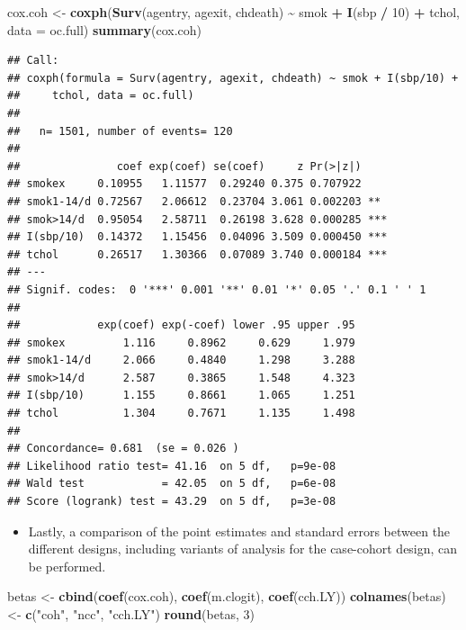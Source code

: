 \documentclass[
]{book}
\newenvironment{Shaded}{\begin{snugshade}}{\end{snugshade}}
\newcommand{\AttributeTok}[1]{\textcolor[rgb]{0.13,0.29,0.53}{#1}}
\newcommand{\DecValTok}[1]{\textcolor[rgb]{0.00,0.00,0.81}{#1}}
\newcommand{\FunctionTok}[1]{\textcolor[rgb]{0.13,0.29,0.53}{\textbf{#1}}}
\newcommand{\NormalTok}[1]{#1}
\newcommand{\OtherTok}[1]{\textcolor[rgb]{0.56,0.35,0.01}{#1}}
\newcommand{\SpecialCharTok}[1]{\textcolor[rgb]{0.81,0.36,0.00}{\textbf{#1}}}
\newcommand{\StringTok}[1]{\textcolor[rgb]{0.31,0.60,0.02}{#1}}
\providecommand{\tightlist}{%
  \setlength{\itemsep}{0pt}\setlength{\parskip}{0pt}}
\theoremstyle{definition}
\theoremstyle{definition}
\theoremstyle{definition}
\theoremstyle{definition}
\theoremstyle{remark}
\begin{document}
\begin{Shaded}
\begin{Highlighting}[]
\NormalTok{cox.coh }\OtherTok{\textless{}{-}} \FunctionTok{coxph}\NormalTok{(}\FunctionTok{Surv}\NormalTok{(agentry, agexit, chdeath) }\SpecialCharTok{\textasciitilde{}}
\NormalTok{  smok }\SpecialCharTok{+} \FunctionTok{I}\NormalTok{(sbp }\SpecialCharTok{/} \DecValTok{10}\NormalTok{) }\SpecialCharTok{+}\NormalTok{ tchol, }\AttributeTok{data =}\NormalTok{ oc.full)}
\FunctionTok{summary}\NormalTok{(cox.coh)}
\end{Highlighting}
\end{Shaded}

\begin{verbatim}
## Call:
## coxph(formula = Surv(agentry, agexit, chdeath) ~ smok + I(sbp/10) + 
##     tchol, data = oc.full)
## 
##   n= 1501, number of events= 120 
## 
##               coef exp(coef) se(coef)     z Pr(>|z|)    
## smokex     0.10955   1.11577  0.29240 0.375 0.707922    
## smok1-14/d 0.72567   2.06612  0.23704 3.061 0.002203 ** 
## smok>14/d  0.95054   2.58711  0.26198 3.628 0.000285 ***
## I(sbp/10)  0.14372   1.15456  0.04096 3.509 0.000450 ***
## tchol      0.26517   1.30366  0.07089 3.740 0.000184 ***
## ---
## Signif. codes:  0 '***' 0.001 '**' 0.01 '*' 0.05 '.' 0.1 ' ' 1
## 
##            exp(coef) exp(-coef) lower .95 upper .95
## smokex         1.116     0.8962     0.629     1.979
## smok1-14/d     2.066     0.4840     1.298     3.288
## smok>14/d      2.587     0.3865     1.548     4.323
## I(sbp/10)      1.155     0.8661     1.065     1.251
## tchol          1.304     0.7671     1.135     1.498
## 
## Concordance= 0.681  (se = 0.026 )
## Likelihood ratio test= 41.16  on 5 df,   p=9e-08
## Wald test            = 42.05  on 5 df,   p=6e-08
## Score (logrank) test = 43.29  on 5 df,   p=3e-08
\end{verbatim}

\begin{itemize}
\tightlist
\item
  Lastly, a comparison of the point estimates and standard errors between
  the different designs, including variants of analysis for the case-cohort design, can be performed.
\end{itemize}

\begin{Shaded}
\begin{Highlighting}[]
\NormalTok{betas }\OtherTok{\textless{}{-}} \FunctionTok{cbind}\NormalTok{(}\FunctionTok{coef}\NormalTok{(cox.coh), }\FunctionTok{coef}\NormalTok{(m.clogit), }\FunctionTok{coef}\NormalTok{(cch.LY))}
\FunctionTok{colnames}\NormalTok{(betas) }\OtherTok{\textless{}{-}} \FunctionTok{c}\NormalTok{(}\StringTok{"coh"}\NormalTok{, }\StringTok{"ncc"}\NormalTok{, }\StringTok{"cch.LY"}\NormalTok{)}
\FunctionTok{round}\NormalTok{(betas, }\DecValTok{3}\NormalTok{)}
\end{Highlighting}
\end{Shaded}
\end{document}
